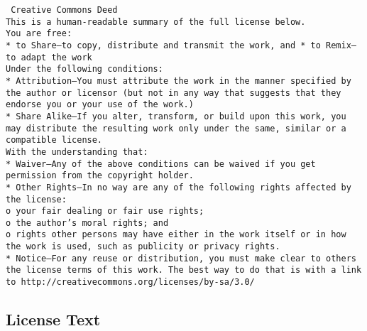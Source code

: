 \setlength{\baselineskip}{0.5\oldbaselineskip}
{\tiny\tt
\noindent
Creative Commons Deed
\\[4pt]
This is a human-readable summary of the full license below.
\\[4pt]
You are free:
\\[4pt]
    * to Share—to copy, distribute and transmit the work, and
    * to Remix—to adapt the work
\\[4pt]
Under the following conditions:
\\[4pt]
    * Attribution—You must attribute the work in the manner specified
    by the author or licensor (but not in any way that suggests that
    they endorse you or your use of the work.)
\\[4pt]
    * Share Alike—If you alter, transform, or build upon this work,
    you may distribute the resulting work only under the same, similar
    or a compatible license.
\\[4pt]
With the understanding that:
\\[4pt]
    * Waiver—Any of the above conditions can be waived if you get
    permission from the copyright holder.
\\[4pt]
    * Other Rights—In no way are any of the following rights affected
    by the license:
\\[4pt]
          o your fair dealing or fair use rights;
\\[4pt]
          o the author's moral rights; and
\\[4pt]
          o rights other persons may have either in the work itself or
          in how the work is used, such as publicity or privacy
          rights.
\\[4pt]
    * Notice—For any reuse or distribution, you must make clear to
    others the license terms of this work. The best way to do that is
    with a link to http://creativecommons.org/licenses/by-sa/3.0/
}


\subsection{License Text}

